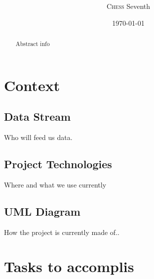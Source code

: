 \documentclass{article}
\title{\textbf{ }} %
\author{\textsc{Chess} Seventh}
\date{\today} %
\begin{document}
\maketitle %
\begin{center}

\end{center}

\begin{abstract}
{ Abstract info }
\end{abstract}

\newpage 

{\vspace*{.5cm}} \section{Context}

{ }


\subsection{Data Stream}

{Who will feed us data.}


\subsection{Project Technologies}

{Where and what we use currently}

\subsection{UML Diagram}

{How the project is currently made of..}




{\vspace*{1cm}} \section{Tasks to accomplis}
\end{document}
